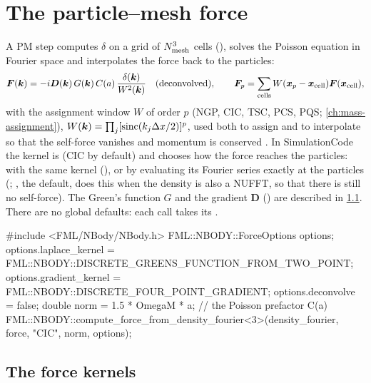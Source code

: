 \section{The particle--mesh force}\label{sec:nbody-pm}

A PM step computes $\delta$ on a grid of $N_{\rm mesh}^3$ cells (), solves the Poisson equation in
Fourier space and interpolates the force back to the particles:
\begin{equation}
\bm F(\bm{k})=-i\bm D(\bm{k})\,G(\bm{k})\,C(a)\,\frac{\delta(\bm{k})}{W^{2}(\bm{k})}\quad(\text{deconvolved}),\qquad
\bm F_p=\sum_{\rm cells}W(\bm{x}_p-\bm{x}_{\rm cell})\bm F(\bm{x}_{\rm cell}),
\end{equation}
with the assignment window $W$ of order $p$ (NGP, CIC, TSC, PCS, PQS; \cref{ch:mass-assignment}),
$W(\bm{k})=\prod_j[\mathrm{sinc}(k_j\Delta x/2)]^p$, used both to assign and to interpolate so that the self-force vanishes
and momentum is conserved \cite{HockneyEastwood1988}. In SimulationCode the kernel is 
(CIC by default) and  chooses how the force reaches the particles: with the same kernel
(), or by evaluating its Fourier series exactly at the particles (; , the
default, does this when the density is also a NUFFT, so that there is still no self-force). The Green's function $G$ and the gradient $\bm D$ () are described in \cref{sec:nbody-kernels}. There are no global defaults: each call takes its .

\begin{cppcode}[A PM force]
#include <FML/NBody/NBody.h>
FML::NBODY::ForceOptions options;
options.laplace_kernel  = FML::NBODY::DISCRETE_GREENS_FUNCTION_FROM_TWO_POINT;
options.gradient_kernel = FML::NBODY::DISCRETE_FOUR_POINT_GRADIENT;
options.deconvolve      = false;
double norm = 1.5 * OmegaM * a;                       // the Poisson prefactor C(a)
FML::NBODY::compute_force_from_density_fourier<3>(density_fourier, force, "CIC", norm, options);
\end{cppcode}

\subsection{The force kernels}\label{sec:nbody-kernels}

